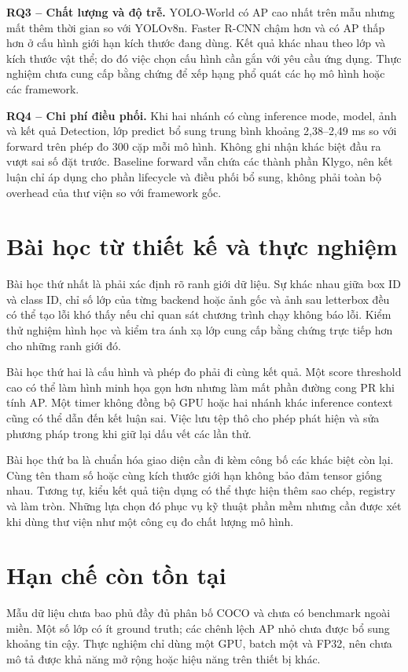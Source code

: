 \textbf{RQ3 -- Chất lượng và độ trễ.} YOLO-World có AP cao nhất trên mẫu nhưng mất thêm thời gian so với YOLOv8n. Faster R-CNN chậm hơn và có AP thấp hơn ở cấu hình giới hạn kích thước đang dùng. Kết quả khác nhau theo lớp và kích thước vật thể; do đó việc chọn cấu hình cần gắn với yêu cầu ứng dụng. Thực nghiệm chưa cung cấp bằng chứng để xếp hạng phổ quát các họ mô hình hoặc các framework.

\textbf{RQ4 -- Chi phí điều phối.} Khi hai nhánh có cùng inference mode, model, ảnh và kết quả Detection, lớp predict bổ sung trung bình khoảng 2,38--2,49 ms so với forward trên phép đo 300 cặp mỗi mô hình. Không ghi nhận khác biệt đầu ra vượt sai số đặt trước. Baseline forward vẫn chứa các thành phần Klygo, nên kết luận chỉ áp dụng cho phần lifecycle và điều phối bổ sung, không phải toàn bộ overhead của thư viện so với framework gốc.

\section{Bài học từ thiết kế và thực nghiệm}
Bài học thứ nhất là phải xác định rõ ranh giới dữ liệu. Sự khác nhau giữa box ID và class ID, chỉ số lớp của từng backend hoặc ảnh gốc và ảnh sau letterbox đều có thể tạo lỗi khó thấy nếu chỉ quan sát chương trình chạy không báo lỗi. Kiểm thử nghiệm hình học và kiểm tra ánh xạ lớp cung cấp bằng chứng trực tiếp hơn cho những ranh giới đó.

Bài học thứ hai là cấu hình và phép đo phải đi cùng kết quả. Một score threshold cao có thể làm hình minh họa gọn hơn nhưng làm mất phần đường cong PR khi tính AP. Một timer không đồng bộ GPU hoặc hai nhánh khác inference context cũng có thể dẫn đến kết luận sai. Việc lưu tệp thô cho phép phát hiện và sửa phương pháp trong khi giữ lại dấu vết các lần thử.

Bài học thứ ba là chuẩn hóa giao diện cần đi kèm công bố các khác biệt còn lại. Cùng tên tham số hoặc cùng kích thước giới hạn không bảo đảm tensor giống nhau. Tương tự, kiểu kết quả tiện dụng có thể thực hiện thêm sao chép, registry và làm tròn. Những lựa chọn đó phục vụ kỹ thuật phần mềm nhưng cần được xét khi dùng thư viện như một công cụ đo chất lượng mô hình.

\section{Hạn chế còn tồn tại}
Mẫu dữ liệu chưa bao phủ đầy đủ phân bố COCO và chưa có benchmark ngoài miền. Một số lớp có ít ground truth; các chênh lệch AP nhỏ chưa được bổ sung khoảng tin cậy. Thực nghiệm chỉ dùng một GPU, batch một và FP32, nên chưa mô tả được khả năng mở rộng hoặc hiệu năng trên thiết bị khác.

